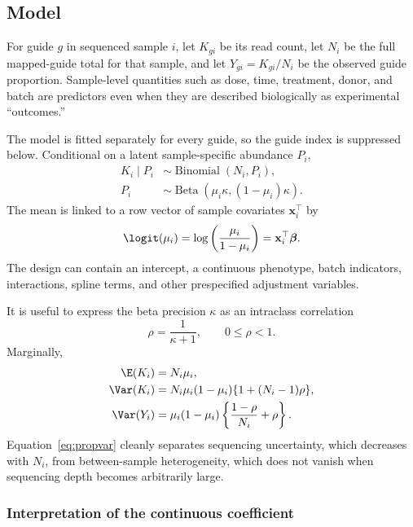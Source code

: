 \subsection{Model}

For guide $g$ in sequenced sample $i$, let $K_{gi}$ be its read count, let
$N_i$ be the full mapped-guide total for that sample, and let
$Y_{gi}=K_{gi}/N_i$ be the observed guide proportion.  Sample-level
quantities such as dose, time, treatment, donor, and batch are predictors even
when they are described biologically as experimental ``outcomes.''

The model is fitted separately for every guide, so the guide index is
suppressed below.  Conditional on a latent sample-specific abundance $P_i$,
\begin{align}
  K_i \mid P_i &\sim \operatorname{Binomial}(N_i,P_i),\\
  P_i &\sim \operatorname{Beta}(\mu_i\kappa,(1-\mu_i)\kappa).
\end{align}
The mean is linked to a row vector of sample covariates $\mathbf{x}_i^\top$ by
\begin{equation}
  \logit(\mu_i)
  = \log\left(\frac{\mu_i}{1-\mu_i}\right)
  = \mathbf{x}_i^\top\boldsymbol{\beta}.
  \label{eq:mean}
\end{equation}
The design can contain an intercept, a continuous phenotype, batch indicators,
interactions, spline terms, and other prespecified adjustment variables.

It is useful to express the beta precision $\kappa$ as an intraclass
correlation
\begin{equation}
  \rho = \frac{1}{\kappa+1}, \qquad 0\leq\rho<1.
\end{equation}
Marginally,
\begin{align}
  \E(K_i) &= N_i\mu_i,\\
  \Var(K_i) &=
  N_i\mu_i(1-\mu_i)\{1+(N_i-1)\rho\}, \label{eq:countvar}\\
  \Var(Y_i) &=
  \mu_i(1-\mu_i)
  \left\{\frac{1-\rho}{N_i}+\rho\right\}. \label{eq:propvar}
\end{align}
Equation~\eqref{eq:propvar} cleanly separates sequencing uncertainty, which
decreases with $N_i$, from between-sample heterogeneity, which does not vanish
when sequencing depth becomes arbitrarily large.

\subsubsection{Interpretation of the continuous coefficient}

